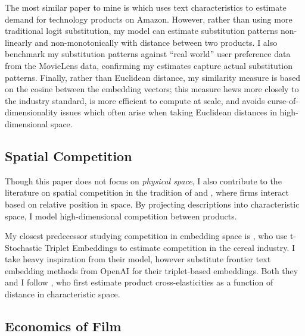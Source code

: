 \documentclass{article}
\begin{document}

The most similar paper to mine is \textcite{compiani2023} which uses text characteristics to estimate demand for technology products on Amazon. However, rather than using more traditional logit substitution, my model can estimate substitution patterns non-linearly and non-monotonically with distance between two products. I also benchmark my substitution patterns against ``real world'' user preference data from the MovieLens data, confirming my estimates capture actual substitution patterns. Finally, rather than Euclidean distance, my similarity measure is based on the cosine between the embedding vectors; this measure hews more closely to the industry standard, is more efficient to compute at scale, and avoids curse-of-dimensionality issues which often arise when taking Euclidean distances in high-dimensional space. 

\subsection{Spatial Competition}

Though this paper does not focus on \emph{physical space}, I also contribute to the literature on spatial competition in the tradition of \textcite{hotelling1929E} and \textcite{salop1979BE}, where firms interact based on relative position in space. By projecting descriptions into characteristic space, I model high-dimensional competition between products. 

My closest predecessor studying competition in embedding space is \textcite{magnolfi2024AM}, who use t-Stochastic Triplet Embeddings to estimate competition in the cereal industry. I take heavy inspiration from their model, however substitute frontier text embedding methods from OpenAI for their triplet-based embeddings. Both they and I follow \textcite{pinkse2002E}, who first estimate product cross-elasticities as a function of distance in characteristic space.

\subsection{Economics of Film}
\end{document}
